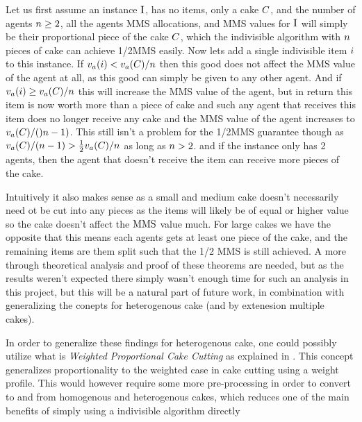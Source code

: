 Let us first assume an instance $\sInstance$, has no items, only a cake $C$, and the number of agents $n\geq2$, all the agents MMS allocations, and MMS values for $\sInstance$ will simply be their proportional piece of the cake $C$, which the indivisible algorithm with $n$ pieces of cake can achieve 1/2MMS easily. Now lets add a single indivisible item $i$ to this instance. If $v_a(i)<v_a(C)/n$ then this good does not affect the MMS value of the agent at all, as this good can simply be given to any other agent. And if $v_a(i)\geq v_a(C)/n$ this will increase the MMS value of the agent, but in return this item is now worth more than a piece of cake and such any agent that receives this item does no longer receive any cake and the MMS value of the agent increases to $v_a(C)/()n-1)$. This still isn't a problem for the 1/2MMS guarantee though as $v_a(C)/(n-1)>\frac{1}{2}v_a(C)/n$ as long as $n>2$. and if the instance only has 2 agents, then the agent that doesn't receive the item can receive more pieces of the cake.

Intuitively it also makes sense as a small and medium cake doesn't necessarily need ot be cut into any pieces as the items will likely be of equal or higher value so the cake doesn't affect the $\text{MMS}$ value much. For large cakes we have the opposite that this means each agents gets at least one piece of the cake, and the remaining items are them split such that the 1/2 MMS is still achieved. A more through theoretical analysis and proof of these theorems are needed, but as the results weren't expected there simply wasn't enough time for such an analysis in this project, but this will be a natural part of future work, in combination with generalizing the conepts for heterogenous cake (and by extenesion multiple cakes).

In order to generalize these findings for heterogenous cake, one could possibly utilize what is  \emph{Weighted Proportional Cake Cutting} as explained in \cite{mms}. This concept generalizes proportionality to the weighted case in cake cutting using a weight profile. This would however require some more pre-processing in order to convert to and from homogenous and heterogenous cakes, which reduces one of the main benefits of simply using a indivisible algorithm directly

